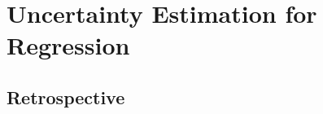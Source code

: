 \chapter{Uncertainty Estimation for Regression}
\label{chap:iid_regression}







\section*{Retrospective}
%